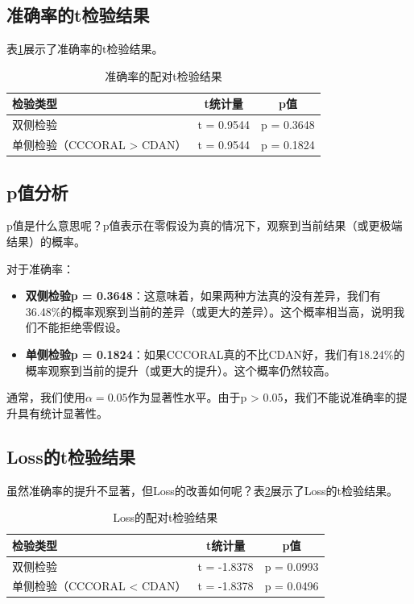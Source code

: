 \documentclass[12pt,a4paper]{ctexart}
\begin{document}
\subsection{准确率的t检验结果}

表\ref{tab:ttest_accuracy}展示了准确率的t检验结果。

\begin{table}[H]
\centering
\caption{准确率的配对t检验结果}
\label{tab:ttest_accuracy}
\begin{tabular}{lcc}
\toprule
\textbf{检验类型} & \textbf{t统计量} & \textbf{p值} \\
\midrule
双侧检验 & t = 0.9544 & p = 0.3648 \\
单侧检验（CCCORAL > CDAN） & t = 0.9544 & p = 0.1824 \\
\bottomrule
\end{tabular}
\end{table}

\subsection{p值分析}

p值是什么意思呢？p值表示在零假设为真的情况下，观察到当前结果（或更极端结果）的概率。

对于准确率：
\begin{itemize}
    \item \textbf{双侧检验p = 0.3648}：这意味着，如果两种方法真的没有差异，我们有36.48\%的概率观察到当前的差异（或更大的差异）。这个概率相当高，说明我们不能拒绝零假设。
    
    \item \textbf{单侧检验p = 0.1824}：如果CCCORAL真的不比CDAN好，我们有18.24\%的概率观察到当前的提升（或更大的提升）。这个概率仍然较高。
\end{itemize}

通常，我们使用$\alpha = 0.05$作为显著性水平。由于p > 0.05，我们不能说准确率的提升具有统计显著性。

\subsection{Loss的t检验结果}

虽然准确率的提升不显著，但Loss的改善如何呢？表\ref{tab:ttest_loss}展示了Loss的t检验结果。

\begin{table}[H]
\centering
\caption{Loss的配对t检验结果}
\label{tab:ttest_loss}
\begin{tabular}{lcc}
\toprule
\textbf{检验类型} & \textbf{t统计量} & \textbf{p值} \\
\midrule
双侧检验 & t = -1.8378 & p = 0.0993 \\
单侧检验（CCCORAL < CDAN） & t = -1.8378 & p = 0.0496 \\
\bottomrule
\end{tabular}
\end{table}
\end{document}
